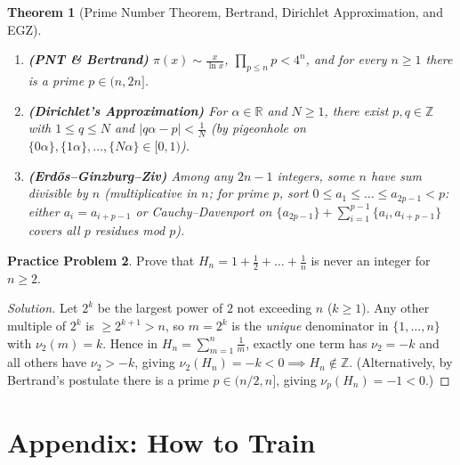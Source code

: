 \documentclass[11pt]{article}
\theoremstyle{plain}
\newtheorem{theorem}{Theorem}[section]
\theoremstyle{definition}
\newtheorem{problem}[theorem]{Practice Problem}
\newenvironment{solution}{\begin{proof}[Solution]}{\end{proof}}
\newcommand{\ZZ}{\mathbb{Z}}
\newcommand{\RR}{\mathbb{R}}
\begin{document}
\begin{theorem}[Prime Number Theorem, Bertrand, Dirichlet Approximation, and EGZ]
\leavevmode
\begin{enumerate}[label=(\alph*)]
\item \textbf{(PNT \& Bertrand)} $\pi(x) \sim \frac{x}{\ln x}$, $\prod_{p \le n} p < 4^n$, and for every $n \ge 1$ there is a prime $p \in (n, 2n]$.
\item \textbf{(Dirichlet's Approximation)} For $\alpha \in \RR$ and $N \ge 1$, there exist $p, q \in \ZZ$ with $1 \le q \le N$ and $|q\alpha - p| < \frac{1}{N}$ (by pigeonhole on $\{0\alpha\}, \{1\alpha\}, \dots, \{N\alpha\} \in [0,1)$).
\item \textbf{(Erdős--Ginzburg--Ziv)} Among any $2n-1$ integers, some $n$ have sum divisible by $n$ (multiplicative in $n$; for prime $p$, sort $0 \le a_1 \le \dots \le a_{2p-1} < p$: either $a_i = a_{i+p-1}$ or Cauchy--Davenport on $\{a_{2p-1}\} + \sum_{i=1}^{p-1}\{a_i, a_{i+p-1}\}$ covers all $p$ residues mod $p$).
\end{enumerate}
\end{theorem}

\begin{problem}
Prove that $H_n = 1 + \frac12 + \dots + \frac1n$ is never an integer for $n \ge 2$.
\end{problem}
\begin{solution}
Let $2^k$ be the largest power of $2$ not exceeding $n$ ($k \ge 1$). Any other multiple of $2^k$ is $\ge 2^{k+1} > n$, so $m = 2^k$ is the \emph{unique} denominator in $\{1,\dots,n\}$ with $\nu_2(m) = k$. Hence in $H_n = \sum_{m=1}^n \frac{1}{m}$, exactly one term has $\nu_2 = -k$ and all others have $\nu_2 > -k$, giving $\nu_2(H_n) = -k < 0 \implies H_n \notin \ZZ$. (Alternatively, by Bertrand's postulate there is a prime $p \in (n/2, n]$, giving $\nu_p(H_n) = -1 < 0$.)
\end{solution}

\part*{Appendix: How to Train}
\end{document}
